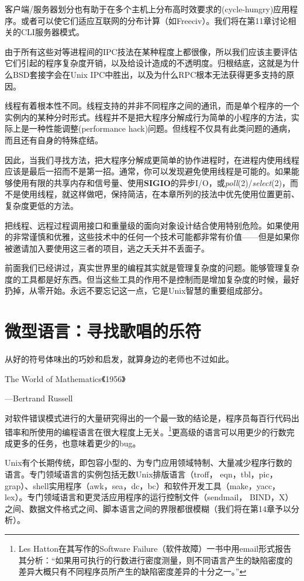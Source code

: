 \documentclass[12pt,oneside]{book}
\begin{document}
客户端/服务器划分也有助于在多个主机上分布高时效要求的(cycle-hungry)应用程序。或者可以使它们适应互联网的分布计算（如Freeciv）。我们将在第11章讨论相关的CLI服务器模式。

由于所有这些对等进程间的IPC技法在某种程度上都很像，所以我们应该主要评估它们引起的程序复杂度开销，以及给设计造成的不透明度。归根结底，这就是为什么BSD套接字会在Unix IPC中胜出，以及为什么RPC根本无法获得更多支持的原因。

线程有着根本性不同。线程支持的并非不同程序之间的通讯，而是单个程序的一个实例内的某种分时形式。线程并不是把大程序分解成行为简单的小程序的方法，实际上是一种性能调整(performance hack)问题。但线程不仅具有此类问题的通病，而且还有自身的特殊症结。

因此，当我们寻找方法，把大程序分解成更简单的协作进程时，在进程内使用线程应该是最后一招而不是第一招。通常，你可以发现避免使用线程是可能的。如果能够使用有限的共享内存和信号量、使用\textbf{SIGIO}的异步I/O，或\textit{poll}(2)/\textit{select}(2)，而不是使用线程，就这样做吧，保持简洁，在本章所列的技法中优先使用位置更前、复杂度更低的方法。

把线程、远程过程调用接口和重量级的面向对象设计结合使用特别危险。如果使用的非常谨慎和优雅，这些技术中的任何一个技术可能都非常有价值——但是如果你被邀请加入要使用这三者的项目，逃之夭夭并不丢面子。

前面我们已经讲过，真实世界里的编程其实就是管理复杂度的问题。能够管理复杂度的工具都是好东西。但当这些工具的作用不是控制而是增加复杂度的时候，最好扔掉，从零开始。永远不要忘记这一点，它是Unix智慧的重要组成部分。


\chapter{微型语言：寻找歌唱的乐符}
\begin{flushright}
从好的符号体味出的巧妙和启发，就算身边的老师也不过如此。
 
{\hfill  The World of Mathematics《1956》} 
 
{\hfill —Bertrand Russell}
\end{flushright}

对软件错误模式进行的大量研究得出的一个最一致的结论是，程序员每百行代码出错率和所使用的编程语言在很大程度上无关。\footnote{Les Hatton在其写作的Software Failure（软件故障）一书中用email形式报告其分析：“如果用可执行的行数进行密度测量，则不同语言产生的缺陷密度的差异大概只有不同程序员所产生的缺陷密度差异的十分之一。”}更高级的语言可以用更少的行数完成更多的任务，也意味着更少的bug。

Unix有个长期传统，即包容小型的、为专门应用领域特制、大量减少程序行数的语言。专门领域语言的实例包括无数Unix排版语言（troff， eqn，tbl，pic，grap）、shell实用程序（awk，sea，dc，bc）和软件开发工具（make，yacc，lex）。专门领域语言和更灵活应用程序的运行控制文件（sendmail， BIND，X）之间、数据文件格式之间、脚本语言之间的界限都很模糊（我们将在第14章予以分析）。
\end{document}
